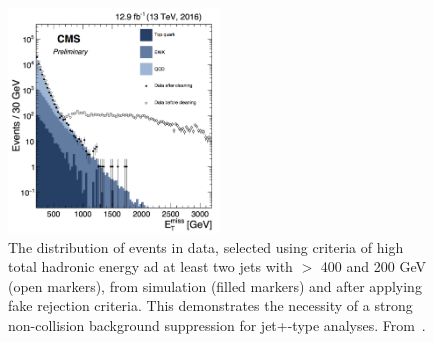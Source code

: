 \begin{figure}[!htpb]
\includegraphics[width=0.5\textwidth]{figures/FakeMETTemp.png}
\caption{The \MET distribution of events in data, selected using criteria of high total hadronic energy ad at least two jets with \pt{} $>$ 400 and 200 GeV (open markers), from simulation (filled markers) and
after applying fake \MET rejection criteria.  
This demonstrates the necessity of a strong non-collision background suppression for jet+\MET-type analyses. From~\cite{CMS-PAS-JME-16-004}.}
\label{fig:fakeMET}
\end{figure}

%

